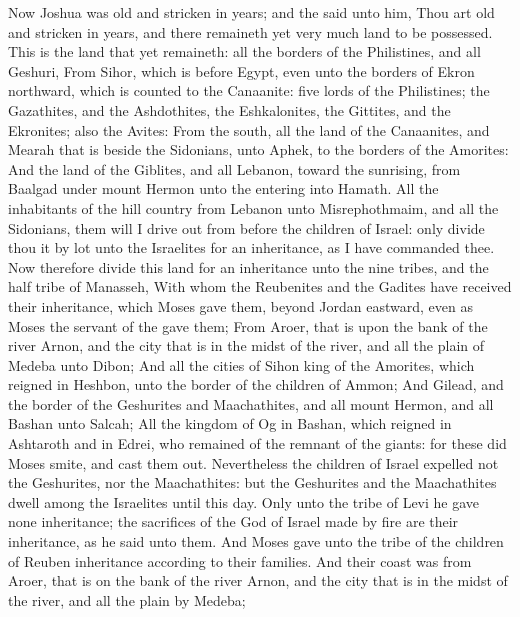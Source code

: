 \begin{biblechapter} %
 Now Joshua was old and stricken in years; and the \LORD said unto him, Thou art old and stricken in years, and there remaineth yet very much land to be possessed.
\verse This is the land that yet remaineth: all the borders of the Philistines, and all Geshuri,
\verse From Sihor, which is before Egypt, even unto the borders of Ekron northward, which is counted to the Canaanite: five lords of the Philistines; the Gazathites, and the Ashdothites, the Eshkalonites, the Gittites, and the Ekronites; also the Avites:
\verse From the south, all the land of the Canaanites, and Mearah that is beside the Sidonians, unto Aphek, to the borders of the Amorites:
\verse And the land of the Giblites, and all Lebanon, toward the sunrising, from Baalgad under mount Hermon unto the entering into Hamath.
\verse All the inhabitants of the hill country from Lebanon unto Misrephothmaim, and all the Sidonians, them will I drive out from before the children of Israel: only divide thou it by lot unto the Israelites for an inheritance, as I have commanded thee.
\verse Now therefore divide this land for an inheritance unto the nine tribes, and the half tribe of Manasseh,
 With whom the Reubenites and the Gadites have received their inheritance, which Moses gave them, beyond Jordan eastward, even as Moses the servant of the \LORD gave them;
\verse From Aroer, that is upon the bank of the river Arnon, and the city that is in the midst of the river, and all the plain of Medeba unto Dibon;
\verse And all the cities of Sihon king of the Amorites, which reigned in Heshbon, unto the border of the children of Ammon;
\verse And Gilead, and the border of the Geshurites and Maachathites, and all mount Hermon, and all Bashan unto Salcah;
\verse All the kingdom of Og in Bashan, which reigned in Ashtaroth and in Edrei, who remained of the remnant of the giants: for these did Moses smite, and cast them out.
\verse Nevertheless the children of Israel expelled not the Geshurites, nor the Maachathites: but the Geshurites and the Maachathites dwell among the Israelites until this day.
\verse Only unto the tribe of Levi he gave none inheritance; the sacrifices of the \LORD God of Israel made by fire are their inheritance, as he said unto them.
\verse And Moses gave unto the tribe of the children of Reuben inheritance according to their families.
\verse And their coast was from Aroer, that is on the bank of the river Arnon, and the city that is in the midst of the river, and all the plain by Medeba;

\end{biblechapter}
